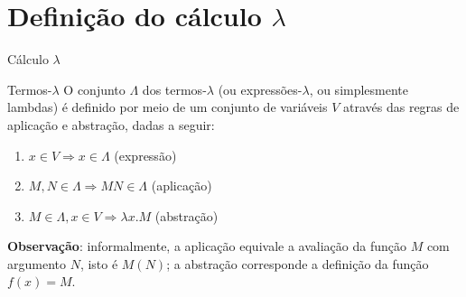 \section{Definição do cálculo $\lambda$}

\begin{frame}[fragile]{Cálculo $\lambda$}

    \begin{block}{Termos-$\lambda$}
        O conjunto $\Lambda$ dos termos-$\lambda$ (ou expressões-$\lambda$, ou 
        simplesmente lambdas) é definido por
        meio de um conjunto de variáveis $V$ através das regras de aplicação e abstração,
        dadas a seguir:
        \begin{enumerate}
            \item $x\in V \Rightarrow x\in \Lambda$ (expressão)
            \item $M, N\in \Lambda \Rightarrow MN\in \Lambda$ (aplicação)
            \item $M\in \Lambda, x\in V \Rightarrow \lambda x.M$ (abstração)
        \end{enumerate}
    \end{block}

    \vspace{0.1in}

    \textbf{Observação}: informalmente, a aplicação equivale a avaliação da função 
        $M$ com argumento $N$, isto é $M(N)$; a abstração corresponde a definição da função 
        $f(x) = M$.

\end{frame}

